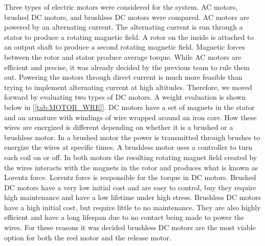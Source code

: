 \indent\indent Three types of electric motors were considered for the system. AC motors, brushed DC motors, and brushless DC motors were compared. AC motors are powered by an alternating current. The alternating current is run through a stator to produce a rotating magnetic field. A rotor on the inside is attached to an output shaft to produce a second rotating magnetic field. Magnetic forces between the rotor and stator produce average torque. While AC motors are efficient and precise, it was already decided by the previous team to rule them out. Powering the motors through direct current is much more feasible than trying to implement alternating current at high altitudes. Therefore, we moved forward by evaluating two types of DC motors. A weight evaluation is shown below in [\ref{tab:MOTOR_WRE}]. DC motors have a set of magnets in the stator and an armature with windings of wire wrapped around an iron core. How these wires are energized is different depending on whether it is a brushed or a brushless motor. In a brushed motor the power is transmitted through brushes to energize the wires at specific times. A brushless motor uses a controller to turn each coil on or off. In both motors the resulting rotating magnet field created by the wires interacts with the magnets in the rotor and produces what is known as Lorentz force. Lorentz force is responsible for the torque in DC motors. Brushed DC motors have a very low initial cost and are easy to control, buy they require high maintenance and have a low lifetime under high stress. Brushless DC motors have a high initial cost, but require little to no maintenance. They are also highly efficient and have a long lifespan due to no contact being made to power the wires. For these reasons it was decided brushless DC motors are the most viable option for both the reel motor and the release motor.

